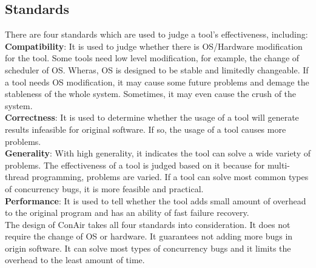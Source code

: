\subsection{Standards} There are four standards which are used to judge a tool's
effectiveness, including:\\
\indent\textbf{Compatibility}: It is used to judge
whether there is OS/Hardware modification for the tool. Some tools need low
level modification, for example, the change of scheduler of OS. Wheras, OS is
designed to be stable and limitedly changeable. If a tool needs OS modification,
it may cause some future problems and demage the stableness of the whole system.
Sometimes, it may even cause the crush of the system.\\
\indent\textbf{Correctness}: It is used to determine whether the usage of a tool
will generate results infeasible for original software. If so, the usage of a
tool causes more problems.\\
\indent\textbf{Generality}: With high generality,
it indicates the tool can solve a wide variety of problems. The effectiveness of
a tool is judged based on it because for multi-thread programming, problems are
varied. If a tool can solve most common types of concurrency bugs, it is more
feasible and practical.\\
\indent\textbf{Performance}: It is used to tell
whether the tool adds small amount of overhead to the original program and has
an ability of fast failure recovery. \\ The design of ConAir takes all four
standards into consideration. It does not require the change of OS or hardware.
It guarantees not adding more bugs in origin software. It can solve most types
of concurrency bugs and it limits the overhead to the least amount of time.
